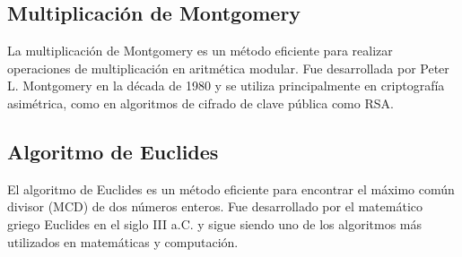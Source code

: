 \subsection{Multiplicación de Montgomery}
La multiplicación de Montgomery es un método eficiente para realizar operaciones de multiplicación en aritmética modular. Fue desarrollada por Peter L. Montgomery en la década de 1980 y se utiliza principalmente en criptografía asimétrica, como en algoritmos de cifrado de clave pública como RSA.

\subsection{Algoritmo de Euclides}
El algoritmo de Euclides es un método eficiente para encontrar el máximo común divisor (MCD) de dos números enteros. Fue desarrollado por el matemático griego Euclides en el siglo III a.C. y sigue siendo uno de los algoritmos más utilizados en matemáticas y computación.